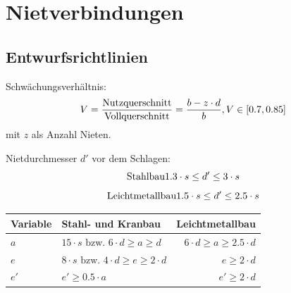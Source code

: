 
\section{Nietverbindungen} %
	\subsection{Entwurfsrichtlinien} %
		Schwächungsverhältnis:
		\begin{equation*}
			V = \frac{\text{Nutzquerschnitt}}{\text{Vollquerschnitt}}=  \frac{b-z\cdot d}{b}, \hfill V \in [0.7 , 0.85]
		\end{equation*}
		mit $z$ als Anzahl Nieten.
		
		Nietdurchmesser $d'$ vor dem Schlagen:
		\begin{equation*}
			\text{Stahlbau} \hfill 1.3\cdot s \leq d' \leq 3 \cdot s
		\end{equation*}
		\begin{equation*}
			\text{Leichtmetallbau} \hfill 1.5 \cdot s \leq d' \leq 2.5 \cdot s
		\end{equation*}
		\begin{center}
			\begin{tabular}{llr}
				\toprule
				\textbf{Variable} & \textbf{Stahl- und Kranbau} & \textbf{Leichtmetallbau} \\
				\midrule
				$a$ & $15\cdot s \text{ bzw. } 6\cdot d \geq a \geq d$ & $6\cdot d \geq a \geq 2.5 \cdot d$\\
				$e$ & $8\cdot s \text{ bzw. } 4\cdot d \geq e \geq 2\cdot d$ & $e \geq 2 \cdot d$ \\
				$e'$ & $e' \geq 0.5 \cdot a$ & $e' \geq 2 \cdot d$\\
				\bottomrule
			\end{tabular}
		\end{center}
		

